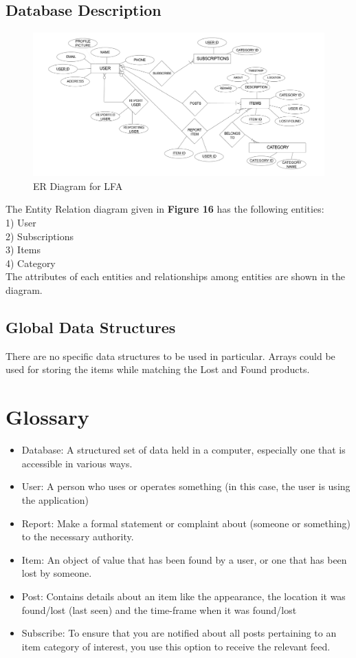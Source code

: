 \documentclass[a4paper,12pt]{article}
\begin{document}
\subsection{Database Description}
\begin{figure}[h!]
  \includegraphics[width=1\textwidth]{erd}
  \caption{ER Diagram for LFA}
\end{figure}
The Entity Relation diagram given in \textbf{Figure 16} has the following entities:\\
 1) User\\
 2) Subscriptions\\
 3) Items\\
 4) Category\\
The attributes of each entities and relationships among entities are shown in the diagram.
\subsection{Global Data Structures}
There are no specific data structures to be used in particular. Arrays could be used for storing the items while matching the Lost and Found products.
\section{Glossary}
\begin{itemize}
\item Database: A structured set of data held in a computer, especially one that is accessible in various ways. 
\item User: A person who uses or operates something (in this case, the user is using the application) 
\item Report: Make a formal statement or complaint about (someone or something) to the necessary authority. 
\item Item: An object of value that has been found by a user, or one that has been lost by someone. 
\item Post: Contains details about an item like the appearance, the location it was found/lost (last seen) and the time-frame when it was found/lost 
\item Subscribe: To ensure that you are notified about all posts pertaining to an item category of interest, you use this option to receive the relevant feed. 
\end{itemize}
\end{document}
